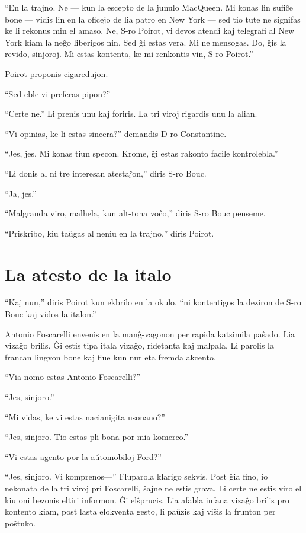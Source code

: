``En la trajno. Ne --- kun la escepto de la junulo MacQueen. Mi konas lin sufiĉe bone --- vidis lin en la oficejo de lia patro en New York --- sed tio tute ne signifas ke li rekonus min el amaso. Ne, S-ro Poirot, vi devos atendi kaj telegrafi al New York kiam la neĝo liberigos nin. Sed ĝi estas vera. Mi ne mensogas. Do, ĝis la revido, sinjoroj. Mi estas kontenta, ke mi renkontis vin, S-ro Poirot.''

Poirot proponis cigaredujon.

``Sed eble vi preferas pipon?''

``Certe ne.'' Li prenis unu kaj foriris. La tri viroj rigardis unu la alian.

``Vi opinias, ke li estas sincera?'' demandis D-ro Constantine.

``Jes, jes. Mi konas tiun specon. Krome, ĝi estas rakonto facile kontrolebla.''

``Li donis al ni tre interesan atestaĵon,'' diris S-ro Bouc.

``Ja, jes.''

``Malgranda viro, malhela, kun alt-tona voĉo,'' diris S-ro Bouc penseme.

``Priskribo, kiu taŭgas al neniu en la trajno,'' diris Poirot.

\chapter[La atesto de la italo]{La atesto de la italo}


``Kaj nun,'' diris Poirot kun ekbrilo en la okulo, ``ni kontentigos la deziron de S-ro Bouc kaj vidos la italon.''

Antonio Foscarelli envenis en la manĝ-vagonon per rapida katsimila paŝado. Lia vizaĝo brilis. Ĝi estis tipa itala vizaĝo, ridetanta kaj malpala. Li parolis la francan lingvon bone kaj flue kun nur eta fremda akcento.

``Via nomo estas Antonio Foscarelli?''

``Jes, sinjoro.''

``Mi vidas, ke vi estas nacianigita usonano?''

``Jes, sinjoro. Tio estas pli bona por mia komerco.''

``Vi estas agento por la aŭtomobiloj Ford?''

``Jes, sinjoro. Vi komprenos---'' Fluparola klarigo sekvis. Post ĝia fino, io nekonata de la tri viroj pri Foscarelli, ŝajne ne estis grava. Li certe ne estis viro el kiu oni bezonis eltiri informon. Ĝi elŝprucis. Lia afabla infana vizaĝo brilis pro kontento kiam, post lasta elokventa gesto, li paŭzis kaj viŝis la frunton per poŝtuko.

